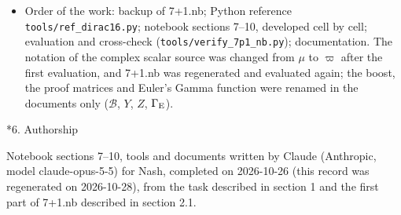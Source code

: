 \documentclass[10pt,a4paper]{article}
\makeatletter
\renewcommand\section{\@startsection{section}{1}{\z@}{-3.5ex \@plus -1ex \@minus -.2ex}{2.3ex \@plus.2ex}{\normalfont\Large\bfseries\raggedright}}
\makeatother
\begin{document}
\begin{itemize}
\item Order of the work: backup of 7+1.nb; Python reference \texttt{tools/\allowbreak{}ref\_\allowbreak{}dirac16.py}; notebook sections 7–10, developed cell by cell; evaluation and cross-check (\texttt{tools/\allowbreak{}verify\_\allowbreak{}7p1\_\allowbreak{}nb.py}); documentation. The notation of the complex scalar source was changed from $\mu$ to $\varpi$ after the first evaluation, and 7+1.nb was regenerated and evaluated again; the boost, the proof matrices and Euler’s Gamma function were renamed in the documents only ($\mathcal B$, $Y$, $Z$, $\Gamma_{\rm E}$).
\end{itemize}
\section*{6. Authorship}
Notebook sections 7–10, tools and documents written by Claude (Anthropic, model claude-opus-5-5) for Nash, completed on 2026-10-26 (this record was regenerated on 2026-10-28), from the task described in section 1 and the first part of 7+1.nb described in section 2.1.
\end{document}
